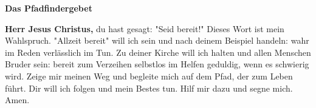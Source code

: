 
\newpage
\vspace*{\fill}
\begin{center}
\begin{minipage}{.6\textwidth}

    \begin{center}
        \textbf{\LARGE{Das Pfadfindergebet} }
        \vspace{.5cm}
    \end{center}

    \begingroup\obeylines\Large
    \textbf{Herr Jesus Christus,}
        du hast gesagt: "Seid bereit!"
        Dieses Wort ist mein Wahlspruch.
        "Allzeit bereit" will ich sein
        und nach deinem Beispiel handeln:
        wahr im Reden
        verlässlich im Tun.
        Zu deiner Kirche will ich halten
        und allen Menschen Bruder sein:
        bereit zum Verzeihen
        selbstlos im Helfen
        geduldig, wenn es schwierig wird.
        Zeige mir meinen Weg
        und begleite mich auf dem Pfad,
        der zum Leben führt.
        Dir will ich folgen und mein Bestes tun.
        Hilf mir dazu und segne mich. Amen.
    \endgroup
    \vspace{2cm}
\end{minipage}
\end{center}
\vfill %
\newpage